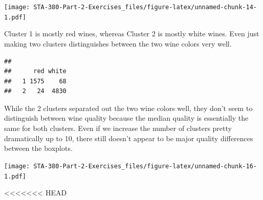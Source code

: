 \documentclass[
]{article}
\newenvironment{Shaded}{\begin{snugshade}}{\end{snugshade}}
\newcommand{\AttributeTok}[1]{\textcolor[rgb]{0.77,0.63,0.00}{#1}}
\newcommand{\DecValTok}[1]{\textcolor[rgb]{0.00,0.00,0.81}{#1}}
\newcommand{\FunctionTok}[1]{\textcolor[rgb]{0.00,0.00,0.00}{#1}}
\newcommand{\NormalTok}[1]{#1}
\newcommand{\OtherTok}[1]{\textcolor[rgb]{0.56,0.35,0.01}{#1}}
\newcommand{\SpecialCharTok}[1]{\textcolor[rgb]{0.00,0.00,0.00}{#1}}
\begin{document}
\texttt{[image: STA-380-Part-2-Exercises\_files/figure-latex/unnamed-chunk-14-1.pdf]}

Cluster 1 is mostly red wines, whereas Cluster 2 is mostly white wines.
Even just making two clusters distinguishes between the two wine colors
very well.

\begin{Shaded}
\end{Shaded}

\begin{verbatim}
##    
##      red white
##   1 1575    68
##   2   24  4830
\end{verbatim}

While the 2 clusters separated out the two wine colors well, they don't
seem to distinguish between wine quality because the median quality is
essentially the same for both clusters. Even if we increase the number
of clusters pretty dramatically up to 10, there still doesn't appear to
be major quality differences between the boxplots.

\begin{Shaded}
\end{Shaded}

\texttt{[image: STA-380-Part-2-Exercises\_files/figure-latex/unnamed-chunk-16-1.pdf]}

\textless\textless\textless\textless\textless\textless\textless{} HEAD
\end{document}
